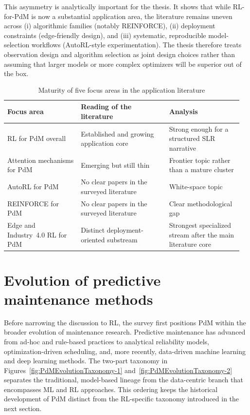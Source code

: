 \documentclass[12pt,oneside]{book}
\renewcommand{\arraystretch}{1.5}
\begin{document}
This asymmetry is analytically important for the thesis. It shows that while RL-for-PdM is now a substantial application area, the literature remains uneven across (i) algorithmic families (notably REINFORCE), (ii) deployment constraints (edge-friendly design), and (iii) systematic, reproducible model-selection workflows (AutoRL-style experimentation). The thesis therefore treats observation design and algorithm selection as joint design choices rather than assuming that larger models or more complex optimizers will be superior out of the box.

\begin{table}[htbp]
	\renewcommand{\arraystretch}{1.3}
	\centering
	\begin{minipage}{\textwidth}
		\caption{Maturity of five focus areas in the application literature}\label{tbl:slr-focus-maturity}
		\begin{tabular}{@{}L{0.30\linewidth}L{0.36\linewidth}L{0.30\linewidth}@{}}
			\toprule
			\textbf{Focus area} & \textbf{Reading of the literature} & \textbf{Analysis}\\
			\midrule
			RL for PdM overall & Established and growing application core & Strong enough for a structured SLR narrative\\
			Attention mechanisms for PdM & Emerging but still thin \citep{Zha23,Guo26,Li25} & Frontier topic rather than a mature cluster\\
			AutoRL for PdM & No clear papers in the surveyed literature & White-space topic\\
			REINFORCE for PdM & No clear papers in the surveyed literature & Clear methodological gap\\
			Edge and Industry~4.0 RL for PdM & Distinct deployment-oriented substream \citep{Ong20,Ong22,Ong22b,Tha23,Yan23} & Strongest specialized stream after the main literature core\\
			\bottomrule
		\end{tabular}
	\end{minipage}
\end{table}

\section{Evolution of predictive maintenance methods}\label{sec:evolution}
Before narrowing the discussion to RL, the survey first positions PdM within the broader evolution of maintenance research. Predictive maintenance has advanced from ad-hoc and rule-based practices to analytical reliability models, optimization-driven scheduling, and, more recently, data-driven machine learning and deep learning methods. The two-part taxonomy in Figures~\ref{fig:PdMEvolutionTaxonomy-1} and~\ref{fig:PdMEvolutionTaxonomy-2} separates the traditional, model-based lineage from the data-centric branch that encompasses ML and RL approaches. This ordering keeps the historical development of PdM distinct from the RL-specific taxonomy introduced in the next section.
\end{document}
